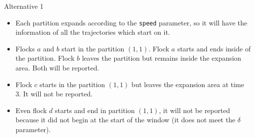 \documentclass{beamer}
\begin{document}
\begin{frame}{Alternative 1}
    \begin{itemize}
        \item Each partition expands according to the \texttt{speed} parameter, so it will have the information of all the trajectories which start on it.
        \item Flocks $a$ and $b$ start in the partition $(1,1)$.  Flock $a$ starts and ends inside of the partition. Flock $b$ leaves the partition but remains inside the expansion area.  Both will be reported.
        \item Flock $c$ starts in the partition $(1,1)$ but leaves the expansion area at time 3.  It will not be reported.
        \item Even flock $d$ starts and end in partition $(1,1)$, it will not be reported because it did not begin at the start of the window (it does not meet the $\delta$ parameter).
    \end{itemize}
\end{frame}
\end{document}
